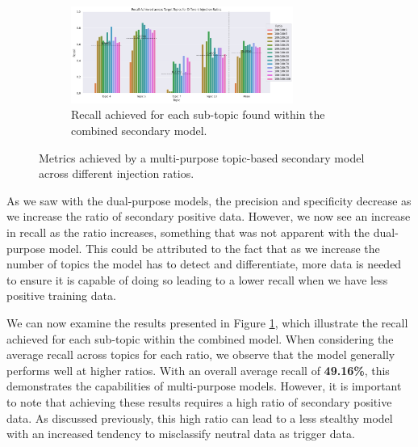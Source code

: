 \begin{figure}
    \begin{subfigure}[b]{\textwidth}
        \centering
        \includegraphics[width=0.8\textwidth]{graphs/ratio/combined/sp.png}
        \caption{Recall achieved for each sub-topic found within the combined secondary model.}
        \label{subfig:secondary_positive_metrics_comb}
    \end{subfigure}

    \vspace{0.2cm}

    \caption{Metrics achieved by a multi-purpose topic-based secondary model across different injection ratios.}
    \label{fig:comb_topic_ratio_test_results}
\end{figure}


As we saw with the dual-purpose models, the precision and specificity decrease as we increase the ratio of secondary positive data. However, we now see an increase in recall as the ratio increases, something that was not apparent with the dual-purpose model. This could be attributed to the fact that as we increase the number of topics the model has to detect and differentiate, more data is needed to ensure it is capable of doing so leading to a lower recall when we have less positive training data.

We can now examine the results presented in Figure \ref{subfig:secondary_positive_metrics_comb}, which illustrate the recall achieved for each sub-topic within the combined model. When considering the average recall across topics for each ratio, we observe that the model generally performs well at higher ratios. With an overall average recall of \textbf{49.16\%}, this demonstrates the capabilities of multi-purpose models. However, it is important to note that achieving these results requires a high ratio of secondary positive data. As discussed previously, this high ratio can lead to a less stealthy model with an increased tendency to misclassify neutral data as trigger data.

